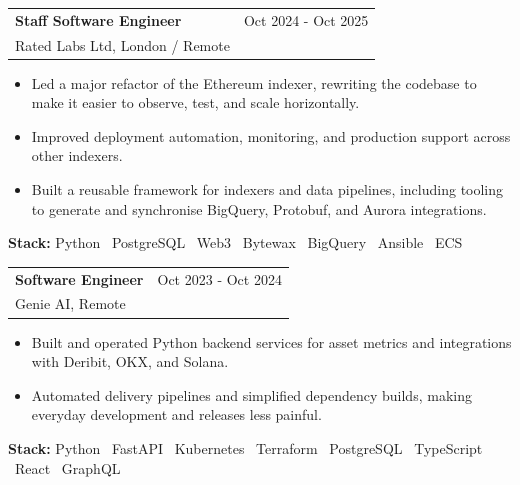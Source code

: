 \documentclass[10pt,a4paper]{article}
\makeatletter
\newcommand{\roleheading}[3]{
  \begin{tabularx}{\textwidth}{@{}Xr@{}}
    {\bfseries\color{Heading} #1} & {\small\color{Muted} #3} \\
    {\small\color{Muted} #2} & \\
  \end{tabularx}
}
\makeatother
\begin{document}
\roleheading{Staff Software Engineer}{Rated Labs Ltd, London / Remote}{Oct 2024 - Oct 2025}
\begin{itemize}

  \item {\small Led a major refactor of the Ethereum indexer, rewriting the codebase to make it easier to observe, test, and scale horizontally.
}

  \item {\small Improved deployment automation, monitoring, and production support across other indexers.
}

  \item {\small Built a reusable framework for indexers and data pipelines, including tooling to generate and synchronise BigQuery, Protobuf, and Aurora integrations.
}

\end{itemize}
{\small\color{Muted}\textbf{Stack:} Python \textbar\ PostgreSQL \textbar\ Web3 \textbar\ Bytewax \textbar\ BigQuery \textbar\ Ansible \textbar\ ECS}\par
\vspace{0.65em}


\roleheading{Software Engineer}{Genie AI, Remote}{Oct 2023 - Oct 2024}
\begin{itemize}

  \item {\small Built and operated Python backend services for asset metrics and integrations with Deribit, OKX, and Solana.
}

  \item {\small Automated delivery pipelines and simplified dependency builds, making everyday development and releases less painful.
}

\end{itemize}
{\small\color{Muted}\textbf{Stack:} Python \textbar\ FastAPI \textbar\ Kubernetes \textbar\ Terraform \textbar\ PostgreSQL \textbar\ TypeScript \textbar\ React \textbar\ GraphQL}\par
\vspace{0.65em}


\newpage
\end{document}
